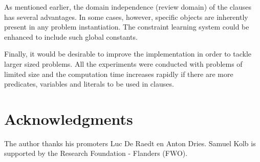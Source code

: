 \documentclass[letterpaper]{article}
\theoremstyle{definition}
\newcommand{\sam}[1]{{\color{red}(#1)}}
\begin{document}
As mentioned earlier, the domain independence \sam{review domain} of the clauses has several advantages.
In some cases, however, specific objects are inherently present in any problem instantiation.
The constraint learning system could be enhanced to include such global constants.

Finally, it would be desirable to improve the implementation in order to tackle larger sized problems.
All the experiments were conducted with problems of limited size and the computation time increases rapidly if there are more predicates, variables and literals to be used in clauses.

\section*{Acknowledgments}
The author thanks his promoters Luc De Raedt en Anton Dries.
Samuel Kolb is supported by the Research Foundation - Flanders (FWO).

\newpage

%
%


\end{document}
